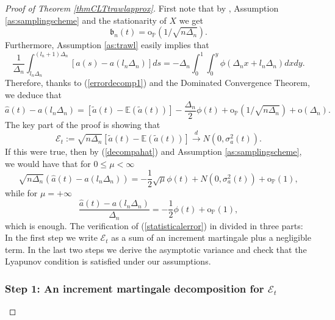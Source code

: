 \documentclass{article}
\theoremstyle{plain}
\theoremstyle{definition}
\theoremstyle{remark}
\begin{document}
\begin{appendix}
\begin{proof}[Proof of Theorem  \ref{thmCLTtrawlapprox}]
	First note that by \citep[Lemma 5.1]{PPSV2021}, Assumption
	\ref{as:samplingscheme} and the stationarity of $X$ we get
	\[
	\mathfrak{b}_{n}(t)=\mathrm{o}_{\mathbb{P}}(1/\sqrt{n\Delta_{n}}).
	\]
	Furthermore, Assumption \ref{as:trawl} easily implies that
	\begin{equation}\label{decompdiscretazationerror}
		\frac{1}{\Delta_{n}}\int_{l_{n}\Delta_{n}}^{(l_{n}+1)\Delta_{n}}\left[a(s)-a(l_{n}\Delta_{n})\right]ds=-\Delta_{n}\int_{0}^{1}\int_{0}^{y}\phi(\Delta_{n}x+l_{n}\Delta_{n})dxdy.
	\end{equation}
	Therefore, thanks to (\ref{errordecomp1}) and the Dominated Convergence
	Theorem, we deduce that
	\begin{equation}
		\hat{a}(t)-a(l_{n}\Delta_{n})=[\tilde{a}(t)-\mathbb{E}(\tilde{a}(t))]-\frac{\Delta_{n}}{2}\phi(t)+\mathrm{o}_{\mathbb{P}}(1/\sqrt{n\Delta_{n}})+\mathrm{o}(\Delta_{n}).\label{decompahat}
	\end{equation}
	The key part of the proof is showing that
	\begin{equation}
		\mathcal{E}_{t}:=\sqrt{n\Delta_{n}}[\tilde{a}(t)-\mathbb{E}(\tilde{a}(t))]\overset{d}{\rightarrow}N(0,\sigma_{a}^{2}(t)).\label{statisticalerror}
	\end{equation}
	If this were true, then by (\ref{decompahat}) and Assumption \ref{as:samplingscheme},
	we would have that for $0\leq\mu<\infty$
	\[
	\sqrt{n\Delta_{n}}(\hat{a}(t)-a(l_{n}\Delta_{n}))=-\frac{1}{2}\sqrt{\mu}\phi(t)+N(0,\sigma_{a}^{2}(t))+\mathrm{o}_{\mathbb{P}}(1),
	\]
	while for $\mu=+\infty$
	\[
	\frac{\hat{a}(t)-a(l_{n}\Delta_{n})}{\Delta_{n}}=-\frac{1}{2}\phi(t)+\mathrm{o}_{\mathbb{P}}(1),
	\]
	which is enough. The verification of (\ref{statisticalerror}) in
	divided in three parts: In the first step we write $\mathcal{E}_{t}$
	as a sum of an increment martingale plus a negligible term. In the
	last two steps we derive the asymptotic variance and check that the
	Lyapunov condition is satisfied under our assumptions. 
	
	\subsubsection*{Step 1: An increment martingale decomposition for $\mathcal{E}_{t}$}
   

\end{proof}
\end{appendix}
\end{document}
